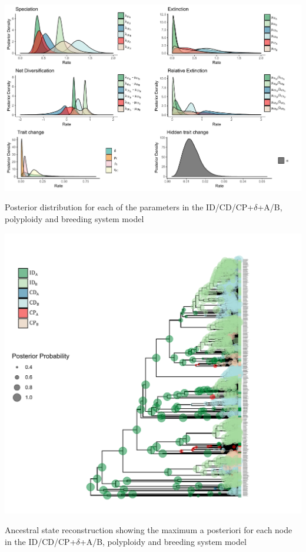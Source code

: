 \begin{suppfigure}
\includegraphics[width=\textwidth]{muhisseDPSIposteriordist.pdf}
\caption{Posterior distribution for each of the parameters in the ID/CD/CP+$\delta$+A/B, polyploidy and breeding system model} %
\label{suppfigure:IDCDCPAB}
\end{suppfigure}

\begin{suppfigure}
\includegraphics[width=\textwidth]{asrIDCDCPdeltaAB.pdf}
\caption{Ancestral state reconstruction showing the maximum a posteriori for each node in the ID/CD/CP+$\delta$+A/B, polyploidy and breeding system model} %
\label{suppfigure:IDCDCPABasr}
\end{suppfigure}
